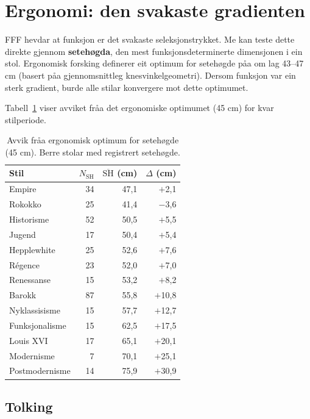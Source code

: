 \documentclass[10pt, a4paper, twocolumn]{article}
\begin{document}
\section{Ergonomi: den svakaste gradienten}

FFF hevdar at funksjon er det svakaste seleksjonstrykket. Me kan teste dette direkte gjennom \textbf{seteh\o gda}, den mest funksjonsdeterminerte dimensjonen i ein stol. Ergonomisk forsking definerer eit optimum for seteh\o gde p\r{a}a om lag 43--47 cm (basert p\r{a}a gjennomsnittleg knesvinkelgeometri). Dersom funksjon var ein sterk gradient, burde alle stilar konvergere mot dette optimumet.

Tabell~\ref{tab:ergo} viser avviket fr\r{a}a det ergonomiske optimumet (45 cm) for kvar stilperiode.

\begin{table}[H]
\centering
\caption{Avvik fr\r{a}a ergonomisk optimum for seteh\o gde (45 cm). Berre stolar med registrert seteh\o gde.}
\label{tab:ergo}
\begin{tabular}{lrrr}
\toprule
\textbf{Stil} & $N_{\text{SH}}$ & $\overline{\text{SH}}$ (cm) & $\Delta$ (cm) \\
\midrule
Empire            & 34 & 47,1 & $+$2,1 \\
Rokokko           & 25 & 41,4 & $-$3,6 \\
Historisme        & 52 & 50,5 & $+$5,5 \\
Jugend            & 17 & 50,4 & $+$5,4 \\
Hepplewhite       & 25 & 52,6 & $+$7,6 \\
R\'{e}gence       & 23 & 52,0 & $+$7,0 \\
Renessanse        & 15 & 53,2 & $+$8,2 \\
Barokk            & 87 & 55,8 & $+$10,8 \\
Nyklassisisme     & 15 & 57,7 & $+$12,7 \\
Funksjonalisme    & 15 & 62,5 & $+$17,5 \\
Louis XVI         & 17 & 65,1 & $+$20,1 \\
Modernisme        &  7 & 70,1 & $+$25,1 \\
Postmodernisme    & 14 & 75,9 & $+$30,9 \\
\bottomrule
\end{tabular}
\end{table}

\subsection{Tolking}
\end{document}
